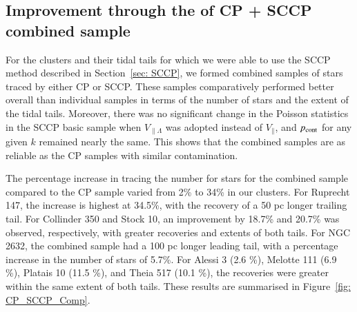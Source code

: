 \documentclass{aa}
\begin{document}



\subsection{Improvement through the of CP + SCCP combined sample}
For the clusters and their tidal tails for which we were able to use the SCCP method described in Section~\ref{sec: SCCP}, we formed combined samples of stars traced by either CP or SCCP. These samples comparatively performed better overall than individual samples in terms of the number of stars and the extent of the tidal tails. Moreover, there was no significant change in the Poisson statistics in the SCCP basic sample when $V_{\parallel \Lambda}$ was adopted instead of $V_\parallel$, and $p_{\rm{cont}}$ for any given $k$ remained nearly the same. This shows that the combined samples are as reliable as the CP samples with similar contamination.


The percentage increase in tracing the number for stars for the combined sample compared to the CP sample varied from 2\% to 34\% in our clusters. For Ruprecht 147, the increase is highest at 34.5\%, with the recovery of a 50 pc longer trailing tail. For Collinder 350 and Stock 10, an improvement by 18.7\% and 20.7\% was observed, respectively, with greater recoveries and extents of both tails. For NGC 2632, the combined sample had a 100 pc longer leading tail, with a percentage increase in the number of stars of 5.7\%. For Alessi 3 (2.6 \%), Melotte 111 (6.9 \%), Platais 10 (11.5 \%), and Theia 517 (10.1 \%), the recoveries were greater within the same extent of both tails. These results are summarised in Figure~\ref{fig: CP_SCCP_Comp}.
\end{document}
